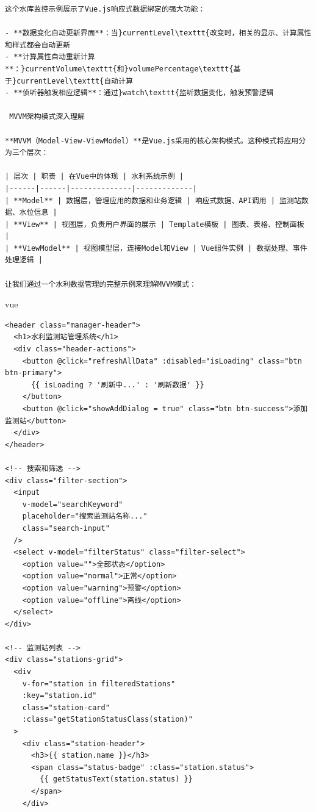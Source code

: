 {{\begin{lstlisting}
这个水库监控示例展示了Vue.js响应式数据绑定的强大功能：

- **数据变化自动更新界面**：当}currentLevel\texttt{改变时，相关的显示、计算属性和样式都会自动更新
- **计算属性自动重新计算**：}currentVolume\texttt{和}volumePercentage\texttt{基于}currentLevel\texttt{自动计算
- **侦听器触发相应逻辑**：通过}watch\texttt{监听数据变化，触发预警逻辑

 MVVM架构模式深入理解

**MVVM（Model-View-ViewModel）**是Vue.js采用的核心架构模式。这种模式将应用分为三个层次：

| 层次 | 职责 | 在Vue中的体现 | 水利系统示例 |
|------|------|--------------|-------------|
| **Model** | 数据层，管理应用的数据和业务逻辑 | 响应式数据、API调用 | 监测站数据、水位信息 |
| **View** | 视图层，负责用户界面的展示 | Template模板 | 图表、表格、控制面板 |
| **ViewModel** | 视图模型层，连接Model和View | Vue组件实例 | 数据处理、事件处理逻辑 |

让我们通过一个水利数据管理的完整示例来理解MVVM模式：
\end{lstlisting}

vue

\begin{verbatim}
<header class="manager-header">
  <h1>水利监测站管理系统</h1>
  <div class="header-actions">
    <button @click="refreshAllData" :disabled="isLoading" class="btn btn-primary">
      {{ isLoading ? '刷新中...' : '刷新数据' }}
    </button>
    <button @click="showAddDialog = true" class="btn btn-success">添加监测站</button>
  </div>
</header>

<!-- 搜索和筛选 -->
<div class="filter-section">
  <input 
    v-model="searchKeyword" 
    placeholder="搜索监测站名称..."
    class="search-input"
  />
  <select v-model="filterStatus" class="filter-select">
    <option value="">全部状态</option>
    <option value="normal">正常</option>
    <option value="warning">预警</option>
    <option value="offline">离线</option>
  </select>
</div>

<!-- 监测站列表 -->
<div class="stations-grid">
  <div 
    v-for="station in filteredStations" 
    :key="station.id"
    class="station-card"
    :class="getStationStatusClass(station)"
  >
    <div class="station-header">
      <h3>{{ station.name }}</h3>
      <span class="status-badge" :class="station.status">
        {{ getStatusText(station.status) }}
      </span>
    </div>
    

\end{verbatim}}}
